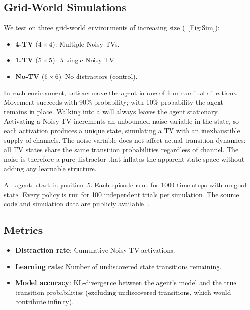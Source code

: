 \documentclass[letterpaper]{article}
\begin{document}
\subsection{Grid-World Simulations}

We test on three grid-world environments of increasing size
(\figurename~\ref{Fig:Sim}):
\begin{itemize}
  \item \textbf{4-TV} ($4 \times 4$): Multiple Noisy TVs.
  \item \textbf{1-TV} ($5 \times 5$): A single Noisy TV.
  \item \textbf{No-TV} ($6 \times 6$): No distractors (control).
\end{itemize}

In each environment, actions move the agent in one of four cardinal
directions.  Movement succeeds with 90\% probability; with 10\%
probability the agent remains in place.  Walking into a wall always
leaves the agent stationary.  Activating a Noisy TV increments an unbounded noise variable in the
state, so each activation produces a unique state, simulating a TV
with an inexhaustible supply of channels.  The noise variable does
not affect actual transition dynamics: all TV states share the same
transition probabilities regardless of channel.  The noise is
therefore a pure distractor that inflates the apparent state space
without adding any learnable structure.

All agents start in position~5.  Each episode runs for 1000 time
steps with no goal state.  Every policy is run for 100 independent
trials per simulation.  The source code and simulation data are publicly
available~\cite{TPIG:github}.

\subsection{Metrics}

\begin{itemize}
  \item \textbf{Distraction rate}: Cumulative Noisy-TV activations.
  \item \textbf{Learning rate}: Number of undiscovered state
    transitions remaining.
  \item \textbf{Model accuracy}: KL-divergence between the agent's
    model and the true transition probabilities (excluding
    undiscovered transitions, which would contribute infinity).
\end{itemize}
\end{document}
